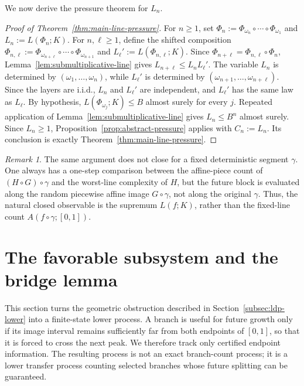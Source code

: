 \documentclass[11pt]{amsart}
\numberwithin{equation}{section}
\theoremstyle{plain}
\theoremstyle{definition}
\theoremstyle{remark}
\newtheorem{remark}[theorem]{Remark}
\begin{document}
We now derive the pressure theorem for \(L_n\).

\begin{proof}[Proof of Theorem~\ref{thm:main-line-pressure}]
For \(n\ge1\), set \(\Phi_n:=\Phi_{\omega_n}\circ\cdots\circ\Phi_{\omega_1}\) and \(L_n:=L(\Phi_n;K)\). For \(n,\ell\ge1\), define the shifted composition \(\Phi_{n,\ell}:=\Phi_{\omega_{n+\ell}}\circ\cdots\circ\Phi_{\omega_{n+1}}\) and \(L_\ell':=L(\Phi_{n,\ell};K)\). Since \(\Phi_{n+\ell}=\Phi_{n,\ell}\circ\Phi_n\), Lemma~\ref{lem:submultiplicative-line} gives \(L_{n+\ell}\le L_nL_\ell'\).
The variable \(L_n\) is determined by \((\omega_1,\dots,\omega_n)\), while \(L_\ell'\) is determined by \((\omega_{n+1},\dots,\omega_{n+\ell})\). Since the layers are i.i.d., \(L_n\) and \(L_\ell'\) are independent, and \(L_\ell'\) has the same law as \(L_\ell\).
By hypothesis, \(L(\Phi_{\omega_j};K)\le B\) almost surely for every \(j\). Repeated application of Lemma~\ref{lem:submultiplicative-line} gives \(L_n\le B^n\) almost surely. Since \(L_n\ge1\), Proposition~\ref{prop:abstract-pressure} applies with \(C_n:=L_n\). Its conclusion is exactly Theorem~\ref{thm:main-line-pressure}.
\end{proof}

\begin{remark}
The same argument does not close for a fixed deterministic segment \(\gamma\). One always has a one-step comparison between the affine-piece count of \((H\circ G)\circ\gamma\) and the worst-line complexity of \(H\), but the future block is evaluated along the random piecewise affine image \(G\circ\gamma\), not along the original \(\gamma\). Thus, the natural closed observable is the supremum \(L(f;K)\), rather than the fixed-line count \(A(f\circ\gamma;[0,1])\).
\end{remark}

\section{The favorable subsystem and the bridge lemma}\label{sec:favorable}

This section turns the geometric obstruction described in Section~\ref{subsec:ldp-lower} into a finite-state lower process. A branch is useful for future growth only if its image interval remains sufficiently far from both endpoints of \([0,1]\), so that it is forced to cross the next peak. We therefore track only certified endpoint information. The resulting process is not an exact branch-count process; it is a lower transfer process counting selected branches whose future splitting can be guaranteed.
\end{document}
